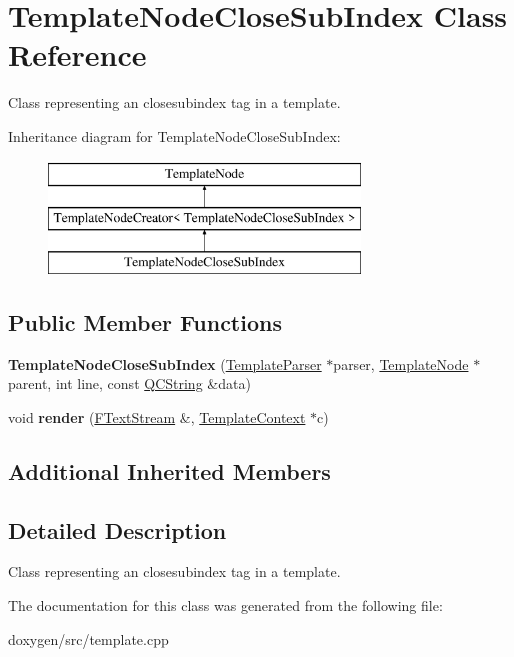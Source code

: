 \hypertarget{class_template_node_close_sub_index}{}\section{Template\+Node\+Close\+Sub\+Index Class Reference}
\label{class_template_node_close_sub_index}


Class representing an \textquotesingle{}closesubindex\textquotesingle{} tag in a template.  


Inheritance diagram for Template\+Node\+Close\+Sub\+Index\+:\begin{figure}[H]
\begin{center}
\leavevmode
\includegraphics[height=3.000000cm]{class_template_node_close_sub_index}
\end{center}
\end{figure}
\subsection*{Public Member Functions}
\begin{DoxyCompactItemize}
\item 
\mbox{\label{class_template_node_close_sub_index_adf85c2143ec427e31acf1918455a8036}} 
{\bfseries Template\+Node\+Close\+Sub\+Index} (\mbox{\hyperlink{class_template_parser}{Template\+Parser}} $\ast$parser, \mbox{\hyperlink{class_template_node}{Template\+Node}} $\ast$parent, int line, const \mbox{\hyperlink{class_q_c_string}{Q\+C\+String}} \&data)
\item 
\mbox{\label{class_template_node_close_sub_index_aa13bc08e74c79a40b5b9ed3f0de813be}} 
void {\bfseries render} (\mbox{\hyperlink{class_f_text_stream}{F\+Text\+Stream}} \&, \mbox{\hyperlink{class_template_context}{Template\+Context}} $\ast$c)
\end{DoxyCompactItemize}
\subsection*{Additional Inherited Members}


\subsection{Detailed Description}
Class representing an \textquotesingle{}closesubindex\textquotesingle{} tag in a template. 

The documentation for this class was generated from the following file\+:\begin{DoxyCompactItemize}
\item 
doxygen/src/template.\+cpp\end{DoxyCompactItemize}
